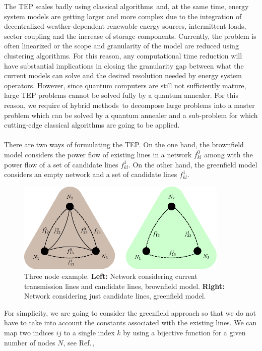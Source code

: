 The TEP scales badly using classical algorithms\,\cite{Oertel2014ComplexityEvaluation} and, at the same time, energy system models are getting larger and more complex due to the integration of decentralized weather-dependent renewable energy sources, intermittent loads, sector coupling and the increase of storage components. Currently, the problem is often linearized or the scope and granularity of the model are reduced using clustering algorithms. For this reason, any computational time reduction will have substantial implications in closing the granularity gap between what the current models can solve and the desired resolution needed by energy system operators. However,  since quantum computers are still not sufficiently mature, large TEP problems cannot be solved fully by a quantum annealer. For this reason, we require of hybrid methods\,\cite{Dilwali2016,Binato2001,Huang2019,MacRae2016,Zhao2021HybridProgrammingb} to decompose large problems into a master problem which can be solved by a quantum annealer and a sub-problem for which cutting-edge classical algorithms are going to be applied.\\\\
There are two ways of formulating the TEP. On the one hand, the brownfield model considers the power flow of existing lines in a network $f_{kl}^{0}$ among with the power flow of a set of candidate lines $f_{kl}^{1}$. On the other hand, the greenfield model considers an empty network and a set of candidate lines $f_{kl}^{1}$.
\begin{figure}[H]
  \begin{center}
\includegraphics[width=0.9\textwidth]{Figures/3NodeBrownGreen.pdf}
  \end{center}
  \caption{Three node example. \textbf{Left:} Network considering current transmission lines and candidate lines, brownfield model. \textbf{Right:} Network considering just candidate lines, greenfield model.}
  \label{fig: ThreeNode}
\end{figure}
For simplicity, we are going to consider the greenfield approach so that we do not have to take into account the constants associated with the existing lines. We can map two indices $ij$ to a single index $k$ by using a bijective function for a given number of nodes $N$, see Ref.\,\cite{Jain2021SolvingComputer},
